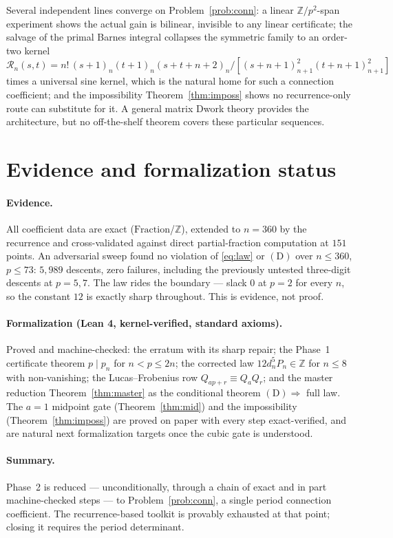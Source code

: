 \documentclass[11pt]{article}
\theoremstyle{definition}
\newcommand{\Z}{\mathbb{Z}}
\begin{document}
Several independent lines converge on Problem~\ref{prob:conn}: a linear
$\Z/p^2$-span experiment shows the actual gain is bilinear, invisible to any
linear certificate; the salvage of the primal Barnes integral collapses the
symmetric family to an order-two kernel
$\mathcal R_n(s,t) = n!\,(s{+}1)_n(t{+}1)_n(s{+}t{+}n{+}2)_n
/[(s{+}n{+}1)_{n+1}^2(t{+}n{+}1)_{n+1}^2]$ times a universal sine kernel,
which is the natural home for such a connection coefficient; and the
impossibility Theorem~\ref{thm:imposs} shows no recurrence-only route can
substitute for it. A general matrix Dwork theory provides the architecture,
but no off-the-shelf theorem covers these particular sequences.

\section{Evidence and formalization status}

\paragraph{Evidence.} All coefficient data are exact
($\mathrm{Fraction}$/$\Z$), extended to $n = 360$ by the recurrence and
cross-validated against direct partial-fraction computation at $151$ points.
An adversarial sweep found no violation of \eqref{eq:law} or $(\mathrm D)$
over $n \le 360$, $p \le 73$: $5{,}989$ descents, zero failures, including the
previously untested three-digit descents at $p = 5,7$. The law rides the
boundary --- slack $0$ at $p = 2$ for every $n$, so the constant $12$ is
exactly sharp throughout. This is evidence, not proof.

\paragraph{Formalization (Lean 4, kernel-verified, standard axioms).}
Proved and machine-checked: the erratum with its sharp repair; the Phase~1
certificate theorem $p \mid p_n$ for $n < p \le 2n$; the corrected law
$12 d_n^5 P_n \in \Z$ for $n \le 8$ with non-vanishing; the Lucas--Frobenius
row $Q_{ap+r}\equiv Q_aQ_r$; and the master reduction Theorem~\ref{thm:master}
as the conditional theorem $(\mathrm D)\Rightarrow$ full law. The $a=1$
midpoint gate (Theorem~\ref{thm:mid}) and the impossibility
(Theorem~\ref{thm:imposs}) are proved on paper with every step exact-verified,
and are natural next formalization targets once the cubic gate is understood.

\paragraph{Summary.} Phase~2 is reduced --- unconditionally, through a chain
of exact and in part machine-checked steps --- to Problem~\ref{prob:conn}, a
single period connection coefficient. The recurrence-based toolkit is provably
exhausted at that point; closing it requires the period determinant.
\end{document}
